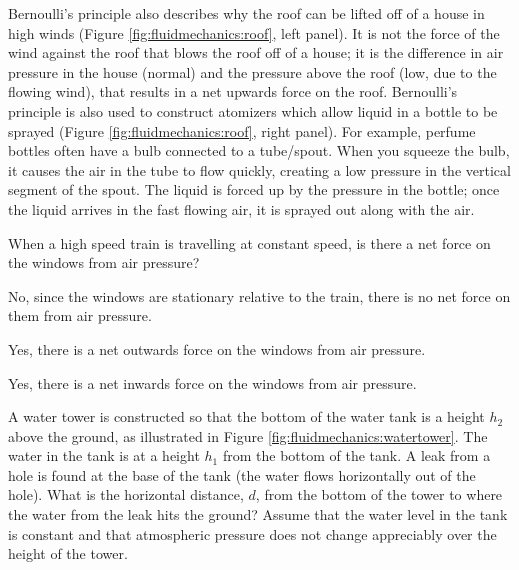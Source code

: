 {{Bernoulli's principle also describes why the roof can be lifted off of a house in high winds (Figure \ref{fig:fluidmechanics:roof}, left panel). It is not the force of the wind against the roof that blows the roof off of a house; it is the difference in air pressure in the house (normal) and the pressure above the roof (low, due to the flowing wind), that results in a net upwards force on the roof. Bernoulli's principle is also used to construct atomizers which allow liquid in a bottle to be sprayed (Figure \ref{fig:fluidmechanics:roof}, right panel). For example, perfume bottles often have a bulb connected to a tube/spout. When you squeeze the bulb, it causes the air in the tube to flow quickly, creating a low pressure in the vertical segment of the spout. The liquid is forced up by the pressure in the bottle; once the liquid arrives in the fast flowing air, it is sprayed out along with the air.

\begin{checkpoint}
\begin{MCquestion}{When a high speed train is travelling at constant speed, is there a net force on the windows from air pressure?}
\item No, since the windows are stationary relative to the train, there is no net force on them from air pressure.
\item Yes, there is a net outwards force on the windows from air pressure. \correct
\item Yes, there is a net inwards force on the windows from air pressure.
\end{MCquestion}
\end{checkpoint}
\newpage
\begin{example}{ A water tower is constructed so that the bottom of the water tank is a height $h_2$ above the ground, as illustrated in Figure \ref{fig:fluidmechanics:watertower}. The water in the tank is at a height $h_1$ from the bottom of the tank. A leak from a hole is found at the base of the tank (the water flows horizontally out of the hole). What is the horizontal distance, $d$, from the bottom of the tower to where the water from the leak hits the ground? Assume that the water level in the tank is constant and that atmospheric pressure does not change appreciably over the height of the tower.}


\end{example}}}
